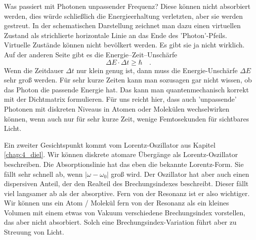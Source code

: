 Was passiert mit Photonen unpassender Frequenz? Diese können nicht absorbiert werden, dies würde schließlich die Energieerhaltung verletzten, aber sie werden gestreut. In der schematischen Darstellung zeichnet man dazu einen virtuellen Zustand als strichlierte horizontale Linie an das Ende des 'Photon'-Pfeils. Virtuelle Zustände können nicht bevölkert werden. Es gibt sie ja nicht wirklich. Auf der anderen Seite gibt es die Energie--Zeit--Unschärfe
\begin{equation}
\Delta E \cdot \Delta t \ge \hbar \quad .
\end{equation}
Wenn die Zeitdauer $\Delta t $ nur klein genug ist, dann muss die Energie-Unschärfe $\Delta E $ sehr groß werden. Für sehr kurze Zeiten kann man sozusagen gar nicht wissen, ob das Photon die passende Energie hat. Das kann man quantenmechanisch korrekt mit der Dichtmatrix formulieren. Für uns reicht hier, dass auch 'unpassende' Photonen mit diskreten Niveaus in Atomen oder Molekülen wechselwirken können, wenn auch nur für sehr kurze Zeit, wenige Femtosekunden für sichtbares Licht.

\begin{marginfigure}
\caption{Der dispersive Anteil des Lorentz-Oszillators fällt langsamer ab als der absorptive. }
\end{marginfigure}
 

Ein zweiter Gesichtspunkt kommt vom Lorentz-Oszillator aus Kapitel \ref{chap:4_diel}. Wir können diskrete atomare Übergänge als Lorentz-Oszillator beschreiben. Die Absorptionslinie hat das eben die bekannte Lorentz-Form. Sie fällt sehr schnell ab, wenn $| \omega  - \omega_0 |$ groß wird. Der Oszillator hat aber auch einen dispersiven Anteil, der den Realteil des Brechungsindexes beschreibt. Dieser fällt viel langsamer ab als der absorptive. Fern von der Resonanz ist er also wichtiger. Wir können uns ein Atom / Molekül fern von der Resonanz als ein kleines Volumen mit einem etwas von Vakuum verschiedene Brechungsindex vorstellen, das aber nicht absorbiert. Solch eine Brechungsindex-Variation führt aber zu Streuung von Licht.

\begin{marginfigure}%
\caption{Stokes- und Anti-Stokes-Streuung über einen virtuellen Zustand (strichliert). Die spektrale Position de Rayleigh-Linie entspricht der des einfallenden Lasers.}
\end{marginfigure}
 

